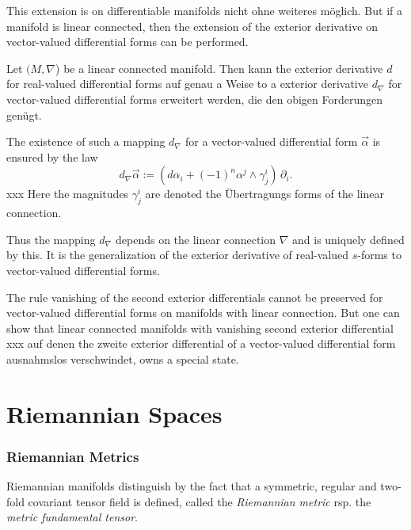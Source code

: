 \documentclass[11pt,twoside]{article}
\begin{document}
\subparagraph{}
This extension is on differentiable manifolds nicht ohne
weiteres m\"oglich.
But if a manifold is linear connected,
then the extension of the exterior derivative
on vector-valued differential forms can be performed.

\begin{theorem}
Let $(M,\nabla$) be a linear connected manifold.
Then kann the exterior derivative $d$ for real-valued differential forms
auf genau a Weise to a exterior derivative $d_{\nabla}$
for vector-valued differential forms erweitert werden,
die den obigen Forderungen gen\"ugt.
\end{theorem}

\subparagraph{}
The existence of such a mapping $d_{\nabla}$ for a
vector-valued differential form $\vec{\alpha}$ is ensured 
by the law
\[
d_{\nabla} \vec{\alpha} :=
(d \alpha_i + (-1)^n \alpha^j \wedge \gamma_j^i) \, \partial_i.
\]
xxx
Here the magnitudes $\gamma_j^i$ are denoted 
the \"Ubertragungs forms of the linear connection.

\subparagraph{}
Thus the mapping $d_{\nabla}$ depends on the linear connection $\nabla$
and is uniquely defined by this.
It is the generalization of the exterior derivative of real-valued $s$-forms
to vector-valued differential forms.

\subparagraph{}
The rule {\wrt} vanishing of the second exterior differentials
cannot be preserved for vector-valued differential forms on manifolds with
linear connection.
But one can show
that linear connected manifolds with vanishing second exterior differential
xxx auf denen the zweite exterior differential of a
vector-valued differential form ausnahmslos verschwindet,
owns a special state.

\newpage
\thispagestyle{empty}
\part{Riemannian Spaces}                                                       %

\section{Riemannian Metrics}
Riemannian manifolds distinguish by the fact
that a symmetric, regular and two-fold covariant tensor field is defined,
called the \textit{Riemannian metric} rsp.
the \textit{metric fundamental tensor}.
\end{document}

